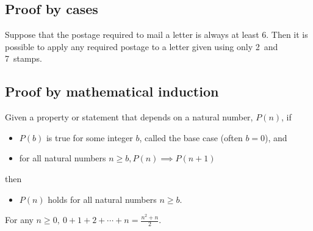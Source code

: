 \subsection{Proof by cases}

\begin{stmt}
Suppose that the postage required to mail a letter is always at least 6\textcent. 
Then it is possible to apply any required postage to a letter given using only 2\textcent\ and 7\textcent\ stamps.
\end{stmt}

\subsection{Proof by mathematical induction}

\begin{axiom}
Given a property or statement that depends on a natural number, $P(n)$, if
\begin{itemize}
\item $P(b)$ is true for some integer $b$, called the base case (often $b = 0$), and
\item for all natural numbers $n \geq b, P(n) \implies P(n+1)$
\end{itemize}
then
\begin{itemize}
\item $P(n)$ holds for all natural numbers $n \geq b$.
\end{itemize}
\end{axiom}


\begin{stmt}
For any $n \geq 0, \ 0 + 1 + 2 + \cdots + n = \frac{n^2 + n}{2}$.
\end{stmt}

